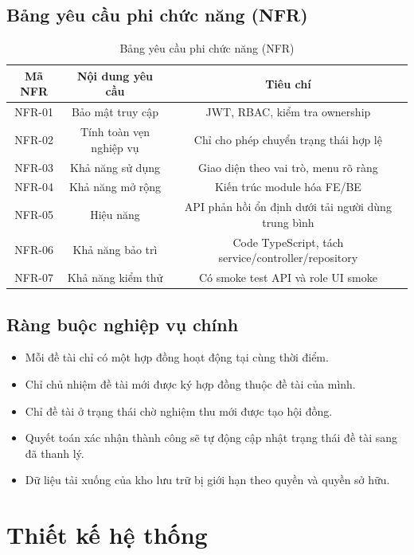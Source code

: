\documentclass[12pt,a4paper]{report}
\begin{document}
\section{Bảng yêu cầu phi chức năng (NFR)}
\begin{table}[H]
\centering
\begin{tabular}{|c|c|c|}
\hline
\textbf{Mã NFR} & \textbf{Nội dung yêu cầu} & \textbf{Tiêu chí} \\ \hline
NFR-01 & Bảo mật truy cập & JWT, RBAC, kiểm tra ownership \\ \hline
NFR-02 & Tính toàn vẹn nghiệp vụ & Chỉ cho phép chuyển trạng thái hợp lệ \\ \hline
NFR-03 & Khả năng sử dụng & Giao diện theo vai trò, menu rõ ràng \\ \hline
NFR-04 & Khả năng mở rộng & Kiến trúc module hóa FE/BE \\ \hline
NFR-05 & Hiệu năng & API phản hồi ổn định dưới tải người dùng trung bình \\ \hline
NFR-06 & Khả năng bảo trì & Code TypeScript, tách service/controller/repository \\ \hline
NFR-07 & Khả năng kiểm thử & Có smoke test API và role UI smoke \\ \hline
\end{tabular}
\caption{Bảng yêu cầu phi chức năng (NFR)}
\end{table}

\section{Ràng buộc nghiệp vụ chính}
\begin{itemize}[leftmargin=1.2cm]
\item Mỗi đề tài chỉ có một hợp đồng hoạt động tại cùng thời điểm.
\item Chỉ chủ nhiệm đề tài mới được ký hợp đồng thuộc đề tài của mình.
\item Chỉ đề tài ở trạng thái chờ nghiệm thu mới được tạo hội đồng.
\item Quyết toán xác nhận thành công sẽ tự động cập nhật trạng thái đề tài sang đã thanh lý.
\item Dữ liệu tải xuống của kho lưu trữ bị giới hạn theo quyền và quyền sở hữu.
\end{itemize}

\chapter{Thiết kế hệ thống}
\end{document}
